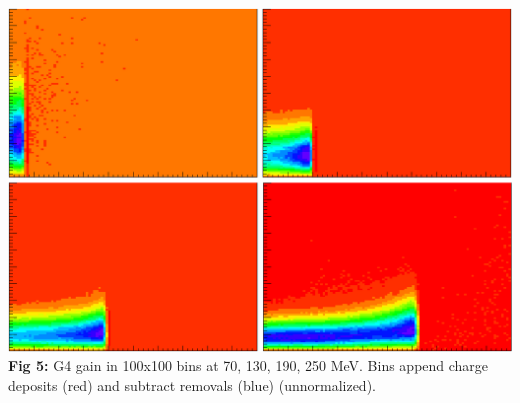 \documentclass[landscape,archE1,fontscale=0.285]{baposter} %
\begin{document}
\begin{poster}
{\begin{center}
\includegraphics[width=0.77\linewidth]{figures/G4_Cu_gain.png}
\\{\fontsize{13.5}{14}\selectfont \textbf{Fig 5:} G4 gain in 100x100 bins at 70, 130, 190, 250 MeV.  Bins append charge deposits (red) and subtract removals (blue) (unnormalized).}
\end{center}

}


\end{poster}
\end{document}
